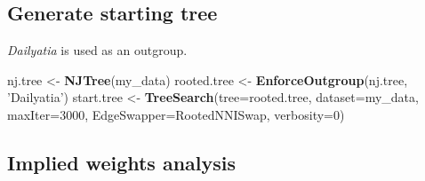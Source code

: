 \documentclass[]{book}
\newenvironment{Shaded}{\begin{snugshade}}{\end{snugshade}}
\newcommand{\KeywordTok}[1]{\textcolor[rgb]{0.13,0.29,0.53}{\textbf{#1}}}
\newcommand{\DataTypeTok}[1]{\textcolor[rgb]{0.13,0.29,0.53}{#1}}
\newcommand{\DecValTok}[1]{\textcolor[rgb]{0.00,0.00,0.81}{#1}}
\newcommand{\StringTok}[1]{\textcolor[rgb]{0.31,0.60,0.02}{#1}}
\newcommand{\NormalTok}[1]{#1}
\theoremstyle{definition}
\theoremstyle{definition}
\theoremstyle{definition}
\theoremstyle{remark}
\begin{document}
\hypertarget{generate-starting-tree}{%
\subsection{Generate starting tree}\label{generate-starting-tree}}

\emph{Dailyatia} is used as an outgroup.

\begin{Shaded}
\begin{Highlighting}[]
\NormalTok{nj.tree <-}\StringTok{ }\KeywordTok{NJTree}\NormalTok{(my_data)}
\NormalTok{rooted.tree <-}\StringTok{ }\KeywordTok{EnforceOutgroup}\NormalTok{(nj.tree, }\StringTok{'Dailyatia'}\NormalTok{)}
\NormalTok{start.tree <-}\StringTok{ }\KeywordTok{TreeSearch}\NormalTok{(}\DataTypeTok{tree=}\NormalTok{rooted.tree, }\DataTypeTok{dataset=}\NormalTok{my_data, }\DataTypeTok{maxIter=}\DecValTok{3000}\NormalTok{,}
                         \DataTypeTok{EdgeSwapper=}\NormalTok{RootedNNISwap, }\DataTypeTok{verbosity=}\DecValTok{0}\NormalTok{)}
\end{Highlighting}
\end{Shaded}

\hypertarget{implied-weights-analysis}{%
\subsection{Implied weights analysis}\label{implied-weights-analysis}}
\end{document}
